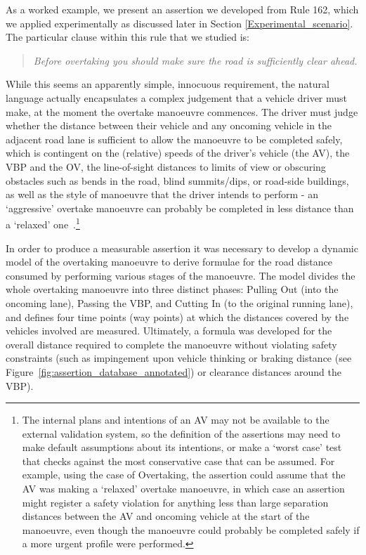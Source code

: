 As a worked example, we present an assertion we developed from Rule 162, which we applied experimentally as discussed later in Section \ref{Experimental_scenario}. The particular clause within this rule that we studied is:
\begin{quote}
    \textit{Before overtaking you should make sure the road is sufficiently clear ahead.}
\end{quote}
While this seems an apparently simple, innocuous requirement, the natural language actually encapsulates a complex judgement that a vehicle driver must make, at the moment the overtake manoeuvre commences. The driver must judge whether the distance between their vehicle and any oncoming vehicle in the adjacent road lane is sufficient to allow the manoeuvre to be completed safely, which is contingent on the (relative) speeds of the driver's vehicle (the AV), the VBP and the OV, the line-of-sight distances to limits of view or obscuring obstacles such as bends in the road, blind summits/dips, or road-side buildings, as well as the style of manoeuvre that the driver intends to perform - an `aggressive' overtake manoeuvre can probably be completed in less distance than a `relaxed' one~\cite{decastro2018counterexample, tkachenko2018line}.\footnote{The internal plans and intentions of an AV may not be available to the external validation system, so the definition of the assertions may need to make default assumptions about its intentions, or make a `worst case' test that checks against the most conservative case that can be assumed. For example, using the case of Overtaking, the assertion could assume that the AV was making a `relaxed' overtake manoeuvre, in which case an assertion might register a safety violation for anything less than large separation distances between the AV and oncoming vehicle at the start of the manoeuvre, even though the manoeuvre could probably be completed safely if a more urgent profile were performed.} 

In order to produce a measurable assertion it was necessary to develop a dynamic model of the overtaking manoeuvre to derive formulae for the road distance consumed by performing various stages of the manoeuvre. 
%
The model divides the whole overtaking manoeuvre into three distinct phases: Pulling Out (into the oncoming lane), Passing the VBP, and Cutting In (to the original running lane), and defines four time points (way points) at which the distances covered by the vehicles involved are measured. Ultimately, a formula was developed for the overall distance required to complete the manoeuvre without violating safety constraints (such as impingement upon vehicle thinking or braking distance %
(see Figure~\ref{fig:assertion_database_annotated}) or clearance distances around the VBP). 

